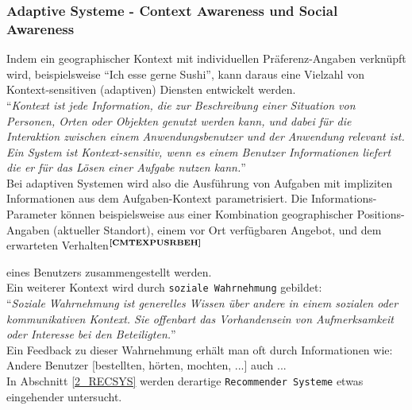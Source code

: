 \subsubsection{Adaptive Systeme - Context Awareness und Social Awareness}\label{sec:GL:ADAPTSYS}
Indem ein geographischer Kontext mit individuellen Präferenz-Angaben verknüpft wird, beispielsweise "`Ich esse gerne Sushi"', kann daraus eine Vielzahl von Kontext-sensitiven (adaptiven) Diensten entwickelt werden.\\
"`\textit{Kontext ist jede Information, die zur Beschreibung einer Situation von Personen, Orten oder Objekten genutzt werden kann, und dabei für die Interaktion zwischen einem Anwendungsbenutzer und der Anwendung relevant ist. Ein System ist Kontext-sensitiv, wenn es einem Benutzer Informationen liefert die er für das Lösen einer Aufgabe  nutzen kann.}"'\cite{COMPASS:AH}\\
Bei adaptiven Systemen wird also die Ausführung von Aufgaben mit impliziten Informationen aus dem Aufgaben-Kontext parametrisiert. Die Informations-Parameter können beispielsweise aus einer Kombination geographischer Positions-Angaben (aktueller Standort), einem vor Ort verfügbaren Angebot, und dem erwarteten Verhalten$^{\textbf{\ref{CMTEXPUSRBEH}}}$%
\addtocounter{footnote}{1}%
 eines Benutzers zusammengestellt werden.\\ 
Ein weiterer Kontext wird durch \texttt{soziale Wahrnehmung} gebildet:\\
"`\textit{Soziale Wahrnehmung ist generelles Wissen über andere in einem sozialen oder kommunikativen Kontext. Sie offenbart das Vorhandensein von Aufmerksamkeit oder Interesse bei den Beteiligten.}"'\cite{UNIGE:KOA}\\
Ein Feedback zu dieser Wahrnehmung erhält man oft durch Informationen wie: Andere Benutzer [bestellten, hörten, mochten, ...] auch ...\\
In Abschnitt \ref{2_RECSYS} werden derartige \texttt{Recommender Systeme} etwas eingehender untersucht. 

